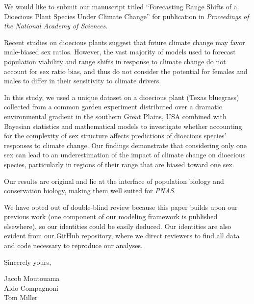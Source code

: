 \documentclass{article}
\begin{document}
We would like to submit our manuscript titled “Forecasting Range Shifts of a Dioecious Plant Species Under Climate Change” for publication in  \textit{
Proceedings of the National Academy of Sciences}.

Recent studies on dioecious plants suggest that future climate change may favor male-biased sex ratios. However, the vast majority of models used to forecast population viability and range shifts in response to climate change do not account for sex ratio bias, and thus do not consider the potential for females and males to differ in their sensitivity to climate drivers.

In this study, we  used a unique dataset on a dioecious plant (Texas bluegrass) collected from a common garden experiment distributed over a dramatic environmental gradient in the southern Great Plains, USA combined with Bayesian statistics and mathematical models to investigate whether accounting for the complexity of sex structure affects predictions of dioecious species’ responses to climate change. Our findings demonstrate that considering only one sex can lead to an underestimation of the impact of climate change on dioecious species, particularly in regions of their range that are biased toward one sex.

Our results are original and lie at the interface of population biology and conservation biology, making them well suited for \textit{PNAS}.

We have opted out of double-blind review because this paper builds upon our previous work (one component of our modeling framework is published elsewhere), so our identities could be easily deduced. Our identities are also evident from our GitHub repository, where we direct reviewers to find all data and code necessary to reproduce our analyses.

\bigskip %

Sincerely yours,

\vspace{20pt} %


Jacob Moutouama \\
Aldo Compagnoni \\
Tom Miller
\end{document}

